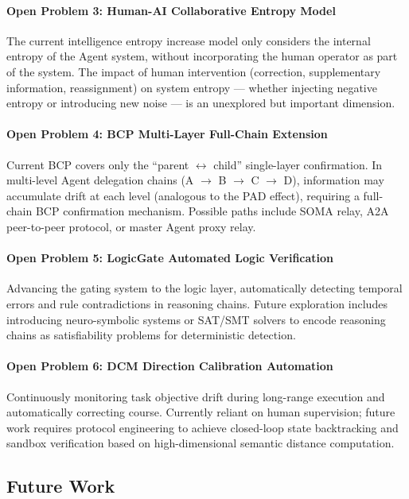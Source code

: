 \documentclass[11pt,a4paper]{article}
\begin{document}
\paragraph{Open Problem 3: Human-AI Collaborative Entropy Model}
The current intelligence entropy increase model only considers the internal entropy of the Agent system, without incorporating the human operator as part of the system. The impact of human intervention (correction, supplementary information, reassignment) on system entropy --- whether injecting negative entropy or introducing new noise --- is an unexplored but important dimension.

\paragraph{Open Problem 4: BCP Multi-Layer Full-Chain Extension}
Current BCP covers only the ``parent $\leftrightarrow$ child'' single-layer confirmation. In multi-level Agent delegation chains (A $\rightarrow$ B $\rightarrow$ C $\rightarrow$ D), information may accumulate drift at each level (analogous to the PAD effect), requiring a full-chain BCP confirmation mechanism. Possible paths include SOMA relay, A2A peer-to-peer protocol, or master Agent proxy relay.

\paragraph{Open Problem 5: LogicGate Automated Logic Verification}
Advancing the gating system to the logic layer, automatically detecting temporal errors and rule contradictions in reasoning chains. Future exploration includes introducing neuro-symbolic systems or SAT/SMT solvers to encode reasoning chains as satisfiability problems for deterministic detection.

\paragraph{Open Problem 6: DCM Direction Calibration Automation}
Continuously monitoring task objective drift during long-range execution and automatically correcting course. Currently reliant on human supervision; future work requires protocol engineering to achieve closed-loop state backtracking and sandbox verification based on high-dimensional semantic distance computation.

\subsection{Future Work}
\label{sec:12.4}
\end{document}

